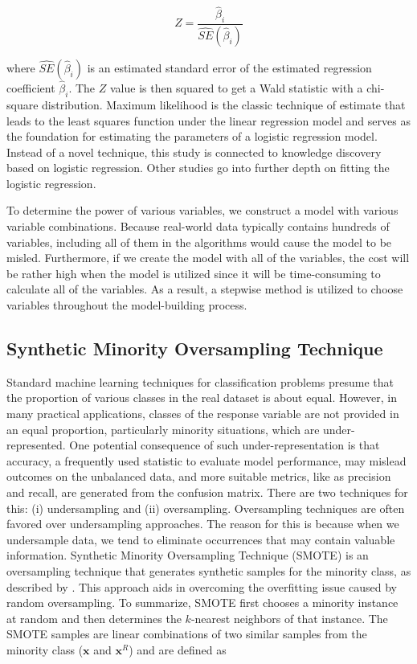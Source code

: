 \begin{equation}
\label{eq:Wald}
Z = \frac{\hat{\beta}_i}{\hat{SE}(\hat{\beta}_i)}
\end{equation}

where \(\hat{SE}(\hat{\beta}_i)\) is an estimated standard error of the
estimated regression coefficient \(\hat{\beta}_i\). The \(Z\) value is
then squared to get a Wald statistic with a chi-square distribution.
Maximum likelihood is the classic technique of estimate that leads to
the least squares function under the linear regression model and serves
as the foundation for estimating the parameters of a logistic regression
model. Instead of a novel technique, this study is connected to
knowledge discovery based on logistic regression. Other studies
\citep{Hosmer1989} go into further depth on fitting the logistic
regression.

To determine the power of various variables, we construct a model with
various variable combinations. Because real-world data typically
contains hundreds of variables, including all of them in the algorithms
would cause the model to be misled. Furthermore, if we create the model
with all of the variables, the cost will be rather high when the model
is utilized since it will be time-consuming to calculate all of the
variables. As a result, a stepwise method is utilized to choose
variables throughout the model-building process.

\hypertarget{synthetic-minority-oversampling-technique}{%
\subsection{Synthetic Minority Oversampling
Technique}\label{synthetic-minority-oversampling-technique}}

Standard machine learning techniques for classification problems presume
that the proportion of various classes in the real dataset is about
equal. However, in many practical applications, classes of the response
variable are not provided in an equal proportion, particularly minority
situations, which are under-represented. One potential consequence of
such under-representation is that accuracy, a frequently used statistic
to evaluate model performance, may mislead outcomes on the unbalanced
data, and more suitable metrics, like as precision and recall, are
generated from the confusion matrix. There are two techniques for this:
(i) undersampling and (ii) oversampling. Oversampling techniques are
often favored over undersampling approaches. The reason for this is
because when we undersample data, we tend to eliminate occurrences that
may contain valuable information. Synthetic Minority Oversampling
Technique (SMOTE) is an oversampling technique that generates synthetic
samples for the minority class, as described by \citet{Chawla2002}. This
approach aids in overcoming the overfitting issue caused by random
oversampling. To summarize, SMOTE first chooses a minority instance at
random and then determines the \(k\)-nearest neighbors of that instance.
The SMOTE samples are linear combinations of two similar samples from
the minority class (\(\mathbf{x}\) and \(\mathbf{x}^R\)) and are defined
as

